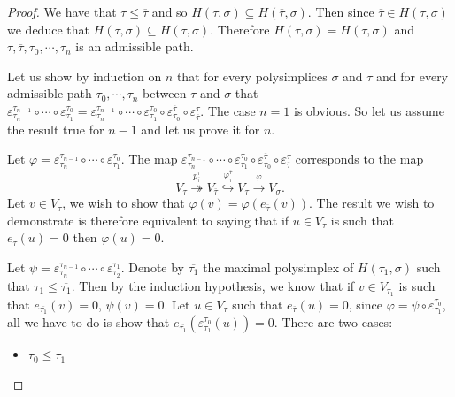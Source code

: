 \documentclass[a4paper,10pt]{amsart}
\begin{document}
\begin{proof}
We have that $\tau \leq \overline{\tau}$ and so $H(\tau,\sigma) \subseteq H(\overline{\tau},\sigma)$. Then since $\overline{\tau} \in H(\tau,\sigma)$ we deduce that $H(\overline{\tau},\sigma) \subseteq H(\tau,\sigma)$. Therefore $H(\tau,\sigma) = H(\overline{\tau},\sigma)$ and $\tau, \overline{\tau}, \tau_{0}, \cdots, \tau_{n}$ is an admissible path.

Let us show by induction on $n$ that for every polysimplices $\sigma$ and $\tau$ and for every admissible path $\tau_{0}, \cdots, \tau_{n}$ between $\tau$ and $\sigma$ that $\varepsilon^{\tau_{n-1}}_{\tau_{n}} \circ \cdots \circ \varepsilon_{\tau_{1}}^{\tau_{0}}=\varepsilon^{\tau_{n-1}}_{\tau_{n}} \circ \cdots \circ \varepsilon_{\tau_{1}}^{\tau_{0}} \circ \varepsilon_{\tau_{0}}^{\overline{\tau}} \circ \varepsilon_{\overline{\tau}}^{\tau}$. The case $n=1$ is obvious. So let us assume the result true for $n-1$ and let us prove it for $n$.

Let $\varphi = \varepsilon^{\tau_{n-1}}_{\tau_{n}} \circ \cdots \circ \varepsilon_{\tau_{1}}^{\tau_{0}}$. The map $\varepsilon^{\tau_{n-1}}_{\tau_{n}} \circ \cdots \circ \varepsilon_{\tau_{1}}^{\tau_{0}} \circ \varepsilon_{\tau_{0}}^{\overline{\tau}} \circ \varepsilon_{\overline{\tau}}^{\tau}$ corresponds to the map
\[V_\tau \overset{p^{\tau}_{\overline{\tau}}}{\twoheadrightarrow} V_{\overline{\tau}}  \overset{\varphi^{\overline{\tau}}_{\tau}}{\hookrightarrow} V_\tau  \overset{\varphi}{\to} V_{\sigma}.\]
Let $v \in V_\tau$, we wish to show that $\varphi(v) = \varphi(e_{\overline{\tau}}(v))$. The result we wish to demonstrate is therefore equivalent to saying that if $u \in V_{\tau}$ is such that $e_{\overline{\tau}}(u)=0$ then $\varphi(u)=0$.


Let $\psi=\varepsilon^{\tau_{n-1}}_{\tau_{n}} \circ \cdots \circ \varepsilon_{\tau_{2}}^{\tau_{1}}$. Denote by $\overline{\tau_{1}}$ the maximal polysimplex of $H(\tau_{1},\sigma)$ such that $\tau_{1} \leq \overline{\tau_{1}}$. Then by the induction hypothesis, we know that if $v \in V_{\tau_{1}}$ is such that $e_{\overline{\tau_{1}}}(v)=0$, $\psi(v)=0$. Let $u \in V_{\tau}$ such that $e_{\overline{\tau}}(u)=0$, since $\varphi = \psi \circ \varepsilon_{\tau_{1}}^{\tau_{0}}$, all we have to do is show that $e_{\overline{\tau_{1}}}(\varepsilon_{\tau_{1}}^{\tau_{0}}(u))=0$. There are two cases:
\begin{itemize}

\item $\tau_{0} \leq \tau_{1}$


\end{itemize}
\end{proof}
\end{document}
